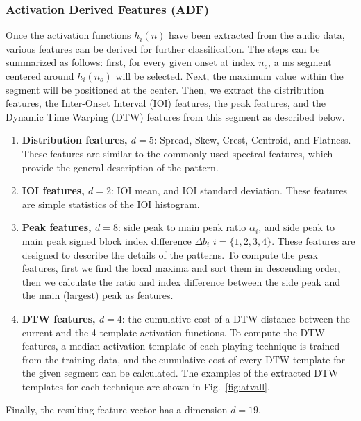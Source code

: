 \documentclass{article}
\begin{document}
\subsubsection{Activation Derived Features (ADF)}
\label{sssec:activ features}
Once the activation functions $h_{i}(n)$ have been extracted from the audio data, various features can be derived for further classification. The steps can be summarized as follows: first, for every given onset at index $n_{o}$, {\color{red}a \unit[400]{ms} segment centered around $h_{i}(n_{o})$ will be selected. Next, the maximum value within the segment will be positioned at the center}. Then, we extract the distribution features, the Inter-Onset Interval (IOI) features, the peak features, and the Dynamic Time Warping (DTW) features from this segment as described below. 

\begin{enumerate}
	\item \textbf{Distribution features, $d = 5$}: Spread, Skew, Crest, Centroid, and Flatness. These features are similar to the commonly used spectral features, which provide the general description of the pattern. 
	\item \textbf{IOI features, $d = 2$}: IOI mean, and IOI standard deviation. These features are simple statistics of the IOI histogram.
	\item \textbf{Peak features, $d = 8$}: side peak to main peak ratio $\alpha_{i}$, and side peak to main peak signed block index difference $\Delta b_{i}$ $i = \{1, 2, 3, 4\}$. These features are designed to describe the details of the patterns. To compute the peak features, first we find the local maxima and sort them in descending order, then we calculate the ratio and index difference between the side peak and the main (largest) peak as features.
	\item \textbf{DTW features, $d = 4$}: the cumulative cost of a DTW distance between the current and the 4 template activation functions. To compute the DTW features, a median activation template of each playing technique is trained from the training data, and the cumulative cost of every DTW template for the given segment can be calculated. The examples of the extracted DTW templates for each technique are shown in Fig.~\ref{fig:atvall}.\\
\end{enumerate}

Finally, the resulting feature vector has a dimension $d = 19$.
\end{document}
